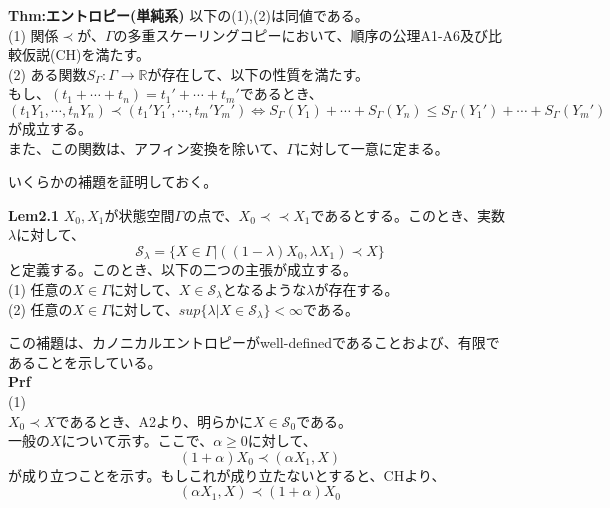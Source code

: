 \documentclass[a4paper,11pt]{jsarticle}
\begin{document}
\begin{itembox}[l]{\textbf{Thm:エントロピー(単純系)}}
    以下の(1),(2)は同値である。\\
    (1) 関係$\prec$が、$\Gamma$の多重スケーリングコピーにおいて、順序の公理A1-A6及び比較仮説(CH)を満たす。\\
    (2) ある関数$S_{\Gamma}:\Gamma \rightarrow \mathbb{R}$が存在して、以下の性質を満たす。\\
    もし、$(t_1+ \cdots +t_n)=t_1'+ \cdots +t_m'$であるとき、
    \begin{equation}
        (t_1 Y_1, \cdots ,t_n Y_n) \prec (t_1' Y_1', \cdots ,t_m' Y_m') \Leftrightarrow S_{\Gamma}(Y_1)+ \cdots +S_{\Gamma}(Y_n) \leq S_{\Gamma}(Y_1')+ \cdots +S_{\Gamma}(Y_m')
    \end{equation}
    が成立する。\\
    また、この関数は、アフィン変換を除いて、$\Gamma$に対して一意に定まる。

\end{itembox}
いくらかの補題を証明しておく。\\
\begin{itembox}[l]{\textbf{Lem2.1}}
$X_0,X_1$が状態空間$\Gamma$の点で、$X_0 \prec \prec X_1$であるとする。このとき、実数$\lambda$に対して、
\begin{equation}
    \mathcal{S}_{\lambda} = \{X\in \Gamma|((1-\lambda)X_0,\lambda X_1) \prec X \}
\end{equation}
と定義する。このとき、以下の二つの主張が成立する。\\
(1) 任意の$X \in \Gamma$に対して、$X \in \mathcal{S}_{\lambda}$となるような$\lambda$が存在する。\\
(2) 任意の$X \in \Gamma$に対して、$sup\{\lambda|X \in \mathcal{S}_{\lambda}\}<\infty$である。

\end{itembox}
この補題は、カノニカルエントロピーがwell-definedであることおよび、有限であることを示している。\\
\textbf{Prf}\\
(1) \\
$X_0 \prec X$であるとき、A2より、明らかに$X \in \mathcal{S}_0$である。\\
一般の$X$について示す。ここで、$\alpha \geq 0$に対して、
\begin{equation}
    (1+\alpha)X_0 \prec (\alpha X_1,X)
\end{equation}
が成り立つことを示す。もしこれが成り立たないとすると、CHより、
\begin{equation}
    (\alpha X_1,X) \prec (1+\alpha)X_0
\end{equation}
\end{document}
